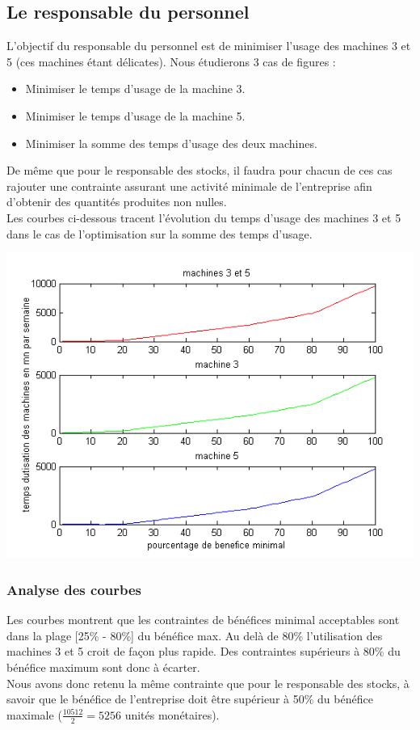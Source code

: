 \documentclass[12pt]{article}
\begin{document}
\subsection{Le responsable du personnel}
L'objectif du responsable du personnel est de minimiser l'usage des machines 3 et 5 (ces machines étant délicates).
Nous étudierons 3 cas de figures : 
\begin{itemize}
\item Minimiser le temps d'usage de la machine 3.
\item Minimiser le temps d'usage de la machine 5.
\item Minimiser la somme des temps d'usage des deux machines.
\end{itemize}
De même que pour le responsable des stocks, il faudra pour chacun de ces cas rajouter une contrainte assurant une  activité minimale de l'entreprise afin d'obtenir des quantités produites non nulles.\\ 
Les courbes ci-dessous tracent l'évolution du temps d'usage des machines 3 et 5 dans le cas de l'optimisation sur la somme des temps d'usage. 
\begin{center}
\includegraphics[scale=0.7]{plots_partie1/plot_personnel.png}
\end{center}
\subsubsection*{Analyse des courbes}
Les courbes montrent que les contraintes de bénéfices minimal acceptables sont dans la plage [25\% - 80\%] du bénéfice max. Au delà de 80\% l'utilisation des machines 3 et 5 croit de façon plus rapide. Des contraintes supérieurs à 80\% du bénéfice maximum sont donc à écarter.  \\
Nous avons donc retenu la même contrainte que pour le responsable des stocks, à savoir que le bénéfice de l'entreprise doit être supérieur à 50\% du bénéfice maximale ($\frac{10512}{2} = 5256$ unités monétaires).
\end{document}
